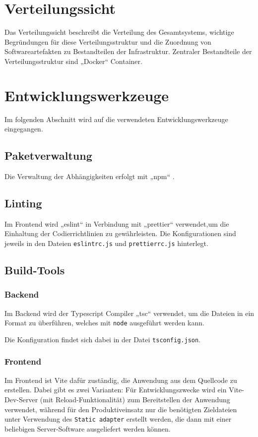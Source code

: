 \documentclass[a4paper, 10pt, conference]{IEEEtran}
\begin{document}
\section{Verteilungssicht} \label{s:verteilungssicht}
Das Verteilungssicht beschreibt die Verteilung des Gesamtsystems,  wichtige Begründungen für diese Verteilungsstruktur und die Zuordnung von Softwareartefakten zu Bestandteilen der Infrastruktur.
Zentraler Bestandteile der Verteilungsstruktur sind „Docker“ \cite{docker} Container.


\section{Entwicklungswerkzeuge} \label{s:entwicklungswerkzeuge}

Im folgenden Abschnitt wird auf die verwendeten Entwicklungswerkzeuge eingegangen.

\subsection{Paketverwaltung}

Die Verwaltung der Abhängigkeiten erfolgt mit „npm“ \cite{npm}.

\subsection{Linting}

Im Frontend wird „eslint“ in Verbindung mit „prettier“ verwendet,um die Einhaltung der Codierrichtlinien zu gewährleisten.
Die Konfigurationen sind jeweils in den Dateien \texttt{eslintrc.js} und \texttt{prettierrc.js} hinterlegt.

\subsection{Build-Tools}

\subsubsection{Backend}

Im Backend wird der Typescript Compiler „tsc“ verwendet, um die Dateien in ein Format zu überführen,
welches mit \texttt{node} ausgeführt werden kann.

Die Konfiguration findet sich dabei in der Datei \texttt{tsconfig.json}.

\subsubsection{Frontend}
Im Frontend ist Vite dafür zuständig, die Anwendung aus dem Quellcode zu erstellen. Dabei gibt es zwei Varianten:
Für Entwicklungszwecke wird ein Vite-Dev-Server (mit Reload-Funktionalität) zum Bereitstellen der Anwendung verwendet,
während für den Produktiveinsatz nur die benötigten Zieldateien unter Verwendung des \texttt{Static adapter} erstellt werden, die dann mit einer beliebigen Server-Software ausgeliefert werden können. 
\end{document}
